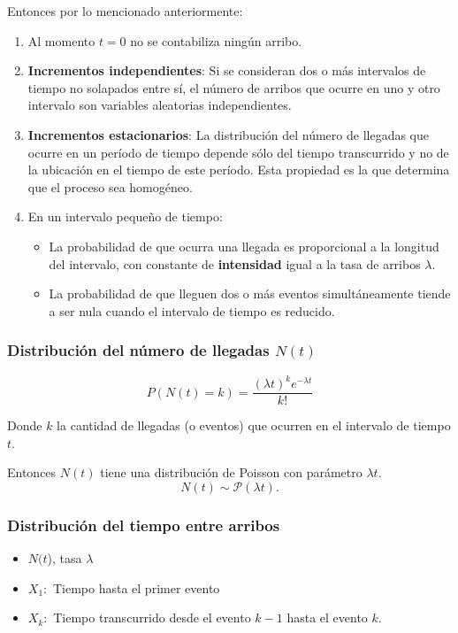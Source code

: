 \documentclass[11pt, a4paper]{article}
\theoremstyle{definition}
\begin{document}
Entonces por lo mencionado anteriormente:

\begin{enumerate}[label=\alph*)]
    \item Al momento $t=0$ no se contabiliza ningún arribo.
    
    \item \textbf{Incrementos independientes}: Si se consideran dos o más intervalos de tiempo no solapados entre sí, el número de arribos que ocurre en uno y otro intervalo son variables aleatorias independientes.
    
    \item \textbf{Incrementos estacionarios}: La distribución del número de llegadas que ocurre en un período de tiempo depende sólo del tiempo transcurrido y no de la ubicación en el tiempo de este período. Esta propiedad es la que determina que el proceso sea homogéneo.
    
    \item En un intervalo pequeño de tiempo:
    \begin{itemize}
        \item La probabilidad de que ocurra una llegada es proporcional a la longitud del intervalo, con constante de \textbf{intensidad} igual a la tasa de arribos $\lambda$.
        \item La probabilidad de que lleguen dos o más eventos simultáneamente tiende a ser nula cuando el intervalo de tiempo es reducido.
    \end{itemize}
\end{enumerate}


\subsubsection{Distribución del número de llegadas $N(t)$}

    \[
    P(N(t)=k)=\frac{(\lambda t)^{k} e^{-\lambda t}}{k!}
    \]  

Donde $k$ la cantidad de llegadas (o eventos) que ocurren en el intervalo de tiempo $t$.

Entonces $N(t)$ tiene una distribución de Poisson con parámetro $\lambda t$.
\[
N(t)\sim\mathcal{P}(\lambda t).
\]
\subsubsection{Distribución del tiempo entre arribos}

\begin{itemize}
    \item $N(t$), tasa $\lambda$
    \item $X_{1}:$ Tiempo hasta el primer evento
    \item $X_k:$ Tiempo transcurrido desde el evento $k-1$ hasta el evento $k$.
\end{itemize}
\end{document}
